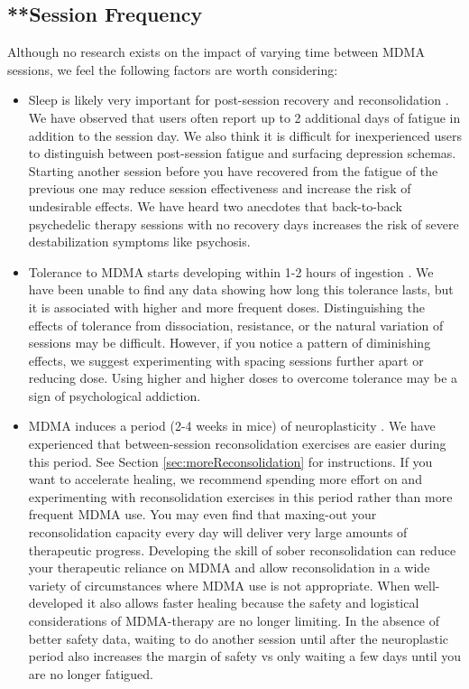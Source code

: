 \documentclass[12pt,letterpaper]{article}
\begin{document}
\subsection{**Session Frequency}
Although no research exists on the impact of varying time between MDMA sessions, we feel the following factors are worth considering:
\begin{itemize}
    \item Sleep is likely very important for post-session recovery and reconsolidation \cite{simon2020sleep}. We have observed that users often report up to 2 additional days of fatigue in addition to the session day. We also think it is difficult for inexperienced users to distinguish between post-session fatigue and surfacing depression schemas. Starting another session before you have recovered from the fatigue of the previous one may reduce session effectiveness and increase the risk of undesirable effects. We have heard two anecdotes that back-to-back psychedelic therapy sessions with no recovery days increases the risk of severe destabilization symptoms like psychosis.
    \item Tolerance to MDMA starts developing within 1-2 hours of ingestion \cite{farreTolerance,parrottTolerance}. We have been unable to find any data showing how long this tolerance lasts, but it is associated with higher and more frequent doses. Distinguishing the effects of tolerance from dissociation, resistance, or the natural variation of sessions may be difficult. However, if you notice a pattern of diminishing effects, we suggest experimenting with spacing sessions further apart or reducing dose. Using higher and higher doses to overcome tolerance may be a sign of psychological addiction.
    \item MDMA induces a period (2-4 weeks in mice) of neuroplasticity \cite{nardouMDMAPlasticity}. We have experienced that between-session reconsolidation exercises are easier during this period. See Section \ref{sec:moreReconsolidation} for instructions. If you want to accelerate healing, we recommend spending more effort on and experimenting with reconsolidation exercises in this period rather than more frequent MDMA use. You may even find that maxing-out your reconsolidation capacity every day will deliver very large amounts of therapeutic progress. Developing the skill of sober reconsolidation can reduce your therapeutic reliance on MDMA and allow reconsolidation in a wide variety of circumstances where MDMA use is not appropriate. When well-developed it also allows faster healing because the safety and logistical considerations of MDMA-therapy are no longer limiting. In the absence of better safety data, waiting to do another session until after the neuroplastic period also increases the margin of safety vs only waiting a few days until you are no longer fatigued.

\end{itemize}
\end{document}
